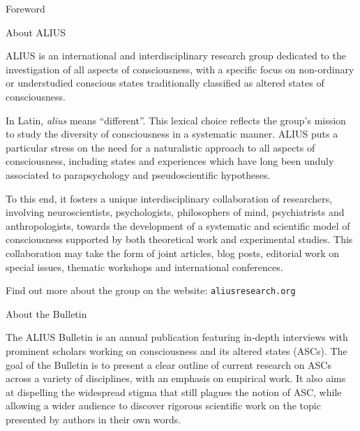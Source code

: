 \clearpage
\thispagestyle{empty}
\vspace*{2.5cm}
{\AliusLato\fontsize{20}{24}\selectfont Foreword\par}
\vspace{0.8cm}
{\AliusLato\fontsize{16}{19}\selectfont About ALIUS\par}
\vspace{0.7cm}
{\fontsize{14}{17}\selectfont
ALIUS is an international and interdisciplinary research group dedicated to the investigation of all aspects of consciousness, with a specific focus on non-ordinary or understudied conscious states traditionally classified as altered states of consciousness.\par
\vspace{0.9em}
In Latin, \textit{alius} means ``different''. This lexical choice reflects the group's mission to study the diversity of consciousness in a systematic manner. ALIUS puts a particular stress on the need for a naturalistic approach to all aspects of consciousness, including states and experiences which have long been unduly associated to parapsychology and pseudoscientific hypotheses.\par
\vspace{0.9em}
To this end, it fosters a unique interdisciplinary collaboration of researchers, involving neuroscientists, psychologists, philosophers of mind, psychiatrists and anthropologists, towards the development of a systematic and scientific model of consciousness supported by both theoretical work and experimental studies. This collaboration may take the form of joint articles, blog posts, editorial work on special issues, thematic workshops and international conferences.\par
\vspace{0.9em}
Find out more about the group on the website: \texttt{aliusresearch.org}\par
}
\vspace{1.1cm}
{\AliusLato\fontsize{16}{19}\selectfont About the Bulletin\par}
\vspace{0.7cm}
{\fontsize{14}{17}\selectfont
The ALIUS Bulletin is an annual publication featuring in-depth interviews with prominent scholars working on consciousness and its altered states (ASCs). The goal of the Bulletin is to present a clear outline of current research on ASCs across a variety of disciplines, with an emphasis on empirical work. It also aims at dispelling the widespread stigma that still plagues the notion of ASC, while allowing a wider audience to discover rigorous scientific work on the topic presented by authors in their own words.\par
}
\clearpage

